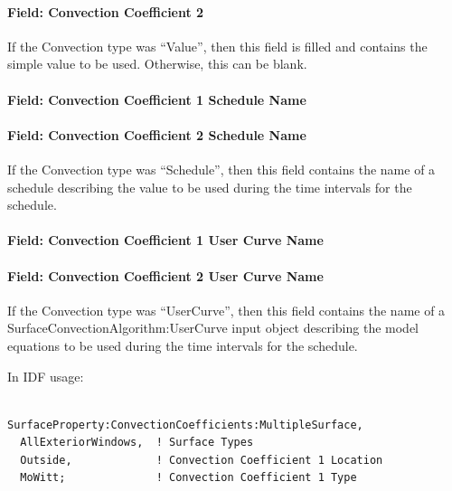 \paragraph{Field: Convection Coefficient 2}\label{field-convection-coefficient-2-1}

If the Convection type was ``Value'', then this field is filled and contains the simple value to be used. Otherwise, this can be blank.

\paragraph{Field: Convection Coefficient 1 Schedule Name}\label{field-convection-coefficient-1-schedule-name-1}

\paragraph{Field: Convection Coefficient 2 Schedule Name}\label{field-convection-coefficient-2-schedule-name-1}

If the Convection type was ``Schedule'', then this field contains the name of a schedule describing the value to be used during the time intervals for the schedule.

\paragraph{Field: Convection Coefficient 1 User Curve Name}\label{field-convection-coefficient-1-user-curve-name-1}

\paragraph{Field: Convection Coefficient 2 User Curve Name}\label{field-convection-coefficient-2-user-curve-name-1}

If the Convection type was ``UserCurve'', then this field contains the name of a SurfaceConvectionAlgorithm:UserCurve input object describing the model equations to be used during the time intervals for the schedule.

In IDF usage:

\begin{lstlisting}

SurfaceProperty:ConvectionCoefficients:MultipleSurface,
  AllExteriorWindows,  ! Surface Types
  Outside,             ! Convection Coefficient 1 Location
  MoWitt;              ! Convection Coefficient 1 Type
\end{lstlisting}


